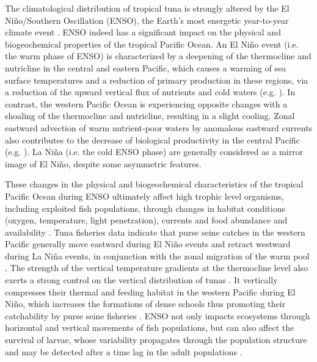 The climatological distribution of tropical tuna is strongly altered by the El Niño/Southern Oscillation (ENSO), the Earth’s most energetic year-to-year climate event \citep{williamsOverviewTunaFisheries2014, caiChangingNinoSouthern2021}. ENSO indeed has a significant impact on the physical and biogeochemical properties of the tropical Pacific Ocean. 
An El Niño event (i.e. the warm phase of ENSO) is characterized by a  deepening of the thermocline and nutricline in the central and eastern Pacific, which causes a warming of sea surface temperatures and a reduction of primary production in these regions, via a reduction of the upward vertical flux of nutrients and cold waters (e.g. \citealp{chavezBiologicalChemicalResponse1999, murtuguddeOceanColorVariability1999}). In contrast, the western Pacific Ocean is experiencing opposite changes with a shoaling of the thermocline and nutricline, resulting in a slight cooling. Zonal eastward advection of warm nutrient‐poor waters by anomalous eastward currents also contributes to the decrease of biological productivity in the central Pacific (e.g. \citealp{chavezBiologicalChemicalResponse1999, picautOceanicZoneConvergence2001}). La Niña (i.e. the cold ENSO phase) are generally considered as a mirror image of El Niño, despite some asymmetric features.  

These changes in the physical and biogeochemical characteristics of the tropical Pacific Ocean during ENSO ultimately affect high trophic level organisms, including exploited fish populations, through changes in habitat conditions (oxygen, temperature, light penetration), currents and food abundance and availability \citep{bertrandNinoSouthernOscillation2020}.  Tuna fisheries data indicate that purse seine catches in the western Pacific generally move eastward during El Niño events and retract  westward during La Niña events, in conjunction with the zonal migration of the warm pool \citep{lehodeyNinoSouthernOscillation1997}. The strength of the vertical temperature gradients at the thermocline level also exerts a strong control on the vertical distribution of tunas \citep[e.g.][]{schaeferMovementsBehaviorHabitat2002}. It vertically compresses their thermal and feeding habitat in the western Pacific during El Niño, which increases the formations of dense schools \citep{mauryCanSchoolingRegulate2017} thus promoting their catchability by purse seine fisheries \citep{bertrandHydrologicalTrophicCharacteristics2002}. ENSO not only impacts ecosystems through horizontal and vertical movements of fish populations, but can also affect the survival of larvae, whose variability propagates through the population structure and may be detected after a time lag in the adult populations \citep{yenSpatialTemporalVariations2016, kimEffectsClimateinducedVariation2015}. 

